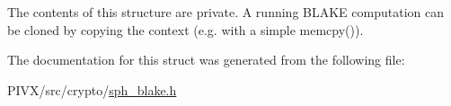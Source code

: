 The contents of this structure are private. A running B\+L\+A\+KE computation can be cloned by copying the context (e.\+g. with a simple {\ttfamily memcpy()}). 

The documentation for this struct was generated from the following file\+:\begin{DoxyCompactItemize}
\item 
P\+I\+V\+X/src/crypto/\mbox{\hyperlink{sph__blake_8h}{sph\+\_\+blake.\+h}}\end{DoxyCompactItemize}

